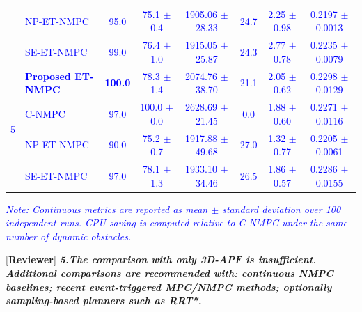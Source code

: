 \documentclass[12pt, twosides]{article}
\theoremstyle{definition}
\begin{document}
\begin{table}[htbp]
{\begin{tabular}{c l c c c c c c}
			& \textcolor{blue}{NP-ET-NMPC} & \textcolor{blue}{95.0} & \textcolor{blue}{75.1 $\pm$ 0.4} & \textcolor{blue}{1905.06 $\pm$ 28.33} & \textcolor{blue}{24.7} & \textcolor{blue}{2.25 $\pm$ 0.98} & \textcolor{blue}{0.2197 $\pm$ 0.0013} \\
			& \textcolor{blue}{SE-ET-NMPC} & \textcolor{blue}{99.0} & \textcolor{blue}{76.4 $\pm$ 1.0} & \textcolor{blue}{1915.05 $\pm$ 25.87} & \textcolor{blue}{24.3} & \textcolor{blue}{2.77 $\pm$ 0.78} & \textcolor{blue}{0.2235 $\pm$ 0.0079} \\
			\midrule
			\multirow{4}{*}{\textcolor{blue}{5}}
			& \textbf{\textcolor{blue}{Proposed ET-NMPC}} & \textbf{\textcolor{blue}{100.0}} & \textcolor{blue}{78.3 $\pm$ 1.4} & \textcolor{blue}{2074.76 $\pm$ 38.70} & \textcolor{blue}{21.1} & \textcolor{blue}{2.05 $\pm$ 0.62} & \textcolor{blue}{0.2298 $\pm$ 0.0129} \\
			& \textcolor{blue}{C-NMPC} & \textcolor{blue}{97.0} & \textcolor{blue}{100.0 $\pm$ 0.0} & \textcolor{blue}{2628.69 $\pm$ 21.45} & \textcolor{blue}{0.0} & \textcolor{blue}{1.88 $\pm$ 0.60} & \textcolor{blue}{0.2271 $\pm$ 0.0116} \\
			& \textcolor{blue}{NP-ET-NMPC} & \textcolor{blue}{90.0} & \textcolor{blue}{75.2 $\pm$ 0.7} & \textcolor{blue}{1917.88 $\pm$ 49.68} & \textcolor{blue}{27.0} & \textcolor{blue}{1.32 $\pm$ 0.77} & \textcolor{blue}{0.2205 $\pm$ 0.0061} \\
			& \textcolor{blue}{SE-ET-NMPC} & \textcolor{blue}{97.0} & \textcolor{blue}{78.1 $\pm$ 1.3} & \textcolor{blue}{1933.10 $\pm$ 34.46} & \textcolor{blue}{26.5} & \textcolor{blue}{1.86 $\pm$ 0.57} & \textcolor{blue}{0.2286 $\pm$ 0.0155} \\
			\bottomrule
		\end{tabular}%
	}
	\vspace{2pt}
	\begin{flushleft}
		\textit{\textcolor{blue}{Note: Continuous metrics are reported as mean $\pm$ standard deviation over 100 independent runs. CPU saving is computed relative to C-NMPC under the same number of dynamic obstacles.}}
	\end{flushleft}
\end{table}

\medskip

\textcolor[rgb]{0.00,0.00,1.00}{[\textbf {Reviewer}]} \textit{\textbf{5.The comparison with only 3D-APF is insufficient. Additional comparisons are recommended with: continuous NMPC baselines; recent event-triggered MPC/NMPC methods; optionally sampling-based planners such as RRT*.}}
\end{document}
